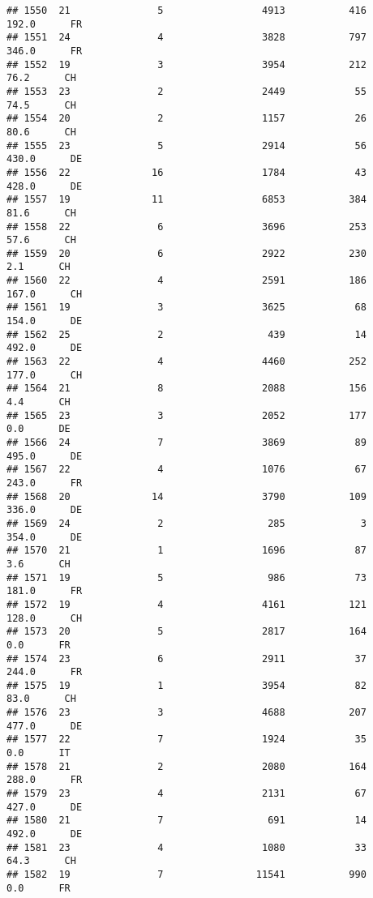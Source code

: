 \documentclass[
]{article}
\begin{document}
\begin{verbatim}
## 1550  21               5                 4913           416    192.0      FR
## 1551  24               4                 3828           797    346.0      FR
## 1552  19               3                 3954           212     76.2      CH
## 1553  23               2                 2449            55     74.5      CH
## 1554  20               2                 1157            26     80.6      CH
## 1555  23               5                 2914            56    430.0      DE
## 1556  22              16                 1784            43    428.0      DE
## 1557  19              11                 6853           384     81.6      CH
## 1558  22               6                 3696           253     57.6      CH
## 1559  20               6                 2922           230      2.1      CH
## 1560  22               4                 2591           186    167.0      CH
## 1561  19               3                 3625            68    154.0      DE
## 1562  25               2                  439            14    492.0      DE
## 1563  22               4                 4460           252    177.0      CH
## 1564  21               8                 2088           156      4.4      CH
## 1565  23               3                 2052           177      0.0      DE
## 1566  24               7                 3869            89    495.0      DE
## 1567  22               4                 1076            67    243.0      FR
## 1568  20              14                 3790           109    336.0      DE
## 1569  24               2                  285             3    354.0      DE
## 1570  21               1                 1696            87      3.6      CH
## 1571  19               5                  986            73    181.0      FR
## 1572  19               4                 4161           121    128.0      CH
## 1573  20               5                 2817           164      0.0      FR
## 1574  23               6                 2911            37    244.0      FR
## 1575  19               1                 3954            82     83.0      CH
## 1576  23               3                 4688           207    477.0      DE
## 1577  22               7                 1924            35      0.0      IT
## 1578  21               2                 2080           164    288.0      FR
## 1579  23               4                 2131            67    427.0      DE
## 1580  21               7                  691            14    492.0      DE
## 1581  23               4                 1080            33     64.3      CH
## 1582  19               7                11541           990      0.0      FR

\end{verbatim}
\end{document}
